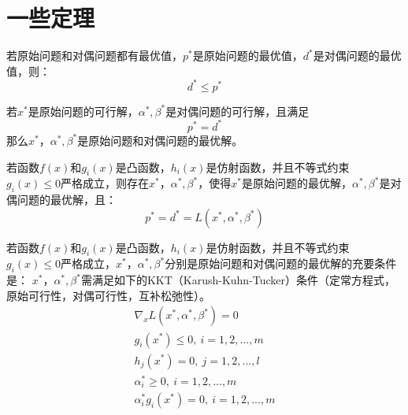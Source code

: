 \section{一些定理}
\begin{theorem}{}{}
    若原始问题和对偶问题都有最优值，$p^*$是原始问题的最优值，$d^*$是对偶问题的最优值，则：
    $$ d^* \le p^* $$
\end{theorem}
\begin{theorem}{}{}
    若$x^*$是原始问题的可行解，$\alpha^*, \beta^*$是对偶问题的可行解，且满足
    $$p^*=d^*$$
    那么$x^*$，$\alpha^*, \beta^*$是原始问题和对偶问题的最优解。
\end{theorem}
\begin{theorem}{}{}
    若函数$f(x)$和$g_i(x)$是凸函数，$h_i(x)$是仿射函数，并且不等式约束$g_i(x)\le0$严格成立，则存在$x^*$，$\alpha^*, \beta^*$，使得$x^*$是原始问题的最优解，$\alpha^*, \beta^*$是对偶问题的最优解，且：
        $$ p^* = d^* = L(x^*,\alpha^*,\beta^*) $$
\end{theorem}
\begin{theorem}{}{}
    若函数$f(x)$和$g_i(x)$是凸函数，$h_i(x)$是仿射函数，并且不等式约束$g_i(x)\le0$严格成立，$x^*$，$\alpha^*,\beta^*$分别是原始问题和对偶问题的最优解的充要条件是：
    $x^*$，$\alpha^*,\beta^*$需满足如下的KKT（Karush-Kuhn-Tucker）条件（定常方程式，原始可行性，对偶可行性，互补松弛性）。
    \begin{gather*}
        \nabla_x L(x^*,\alpha^*,\beta^*) = 0 \\
        g_i(x^*) \le 0,\ i=1, 2, ..., m \\
        h_j(x^*) = 0,\ j=1, 2, ..., l \\
        \alpha_i^* \ge 0,\ i=1, 2, ..., m \\
        \alpha_i^*g_i(x^*) = 0,\ i=1, 2, ..., m
    \end{gather*}
\end{theorem}
